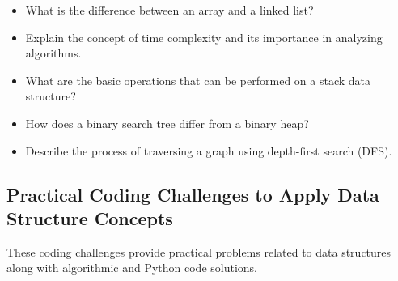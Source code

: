 \documentclass[12pt]{book} %
\begin{document}
\begin{itemize}
    \item What is the difference between an array and a linked list?
    \item Explain the concept of time complexity and its importance in analyzing algorithms.
    \item What are the basic operations that can be performed on a stack data structure?
    \item How does a binary search tree differ from a binary heap?
    \item Describe the process of traversing a graph using depth-first search (DFS).
\end{itemize}

\subsection{Practical Coding Challenges to Apply Data Structure Concepts}
These coding challenges provide practical problems related to data structures along with algorithmic and Python code solutions.
\end{document}
